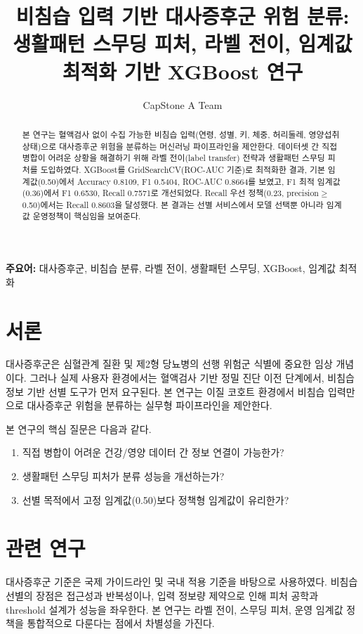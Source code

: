 \documentclass[10pt,twocolumn]{article}
\title{\textbf{비침습 입력 기반 대사증후군 위험 분류:\\생활패턴 스무딩 피처, 라벨 전이, 임계값 최적화 기반 XGBoost 연구}}
\author{CapStone A Team}
\date{}
\begin{document}
\maketitle

\begin{abstract}
본 연구는 혈액검사 없이 수집 가능한 비침습 입력(연령, 성별, 키, 체중, 허리둘레, 영양섭취 상태)으로 대사증후군 위험을 분류하는 머신러닝 파이프라인을 제안한다.
데이터셋 간 직접 병합이 어려운 상황을 해결하기 위해 라벨 전이(label transfer) 전략과 생활패턴 스무딩 피처를 도입하였다.
XGBoost를 GridSearchCV(ROC-AUC 기준)로 최적화한 결과, 기본 임계값(0.50)에서 Accuracy 0.8109, F1 0.5404, ROC-AUC 0.8664를 보였고,
F1 최적 임계값(0.36)에서 F1 0.6530, Recall 0.7571로 개선되었다.
Recall 우선 정책(0.23, precision$\ge$0.50)에서는 Recall 0.8603을 달성했다.
본 결과는 선별 서비스에서 모델 선택뿐 아니라 임계값 운영정책이 핵심임을 보여준다.
\end{abstract}

\noindent\textbf{주요어:} 대사증후군, 비침습 분류, 라벨 전이, 생활패턴 스무딩, XGBoost, 임계값 최적화

\section{서론}
대사증후군은 심혈관계 질환 및 제2형 당뇨병의 선행 위험군 식별에 중요한 임상 개념이다.
그러나 실제 사용자 환경에서는 혈액검사 기반 정밀 진단 이전 단계에서, 비침습 정보 기반 선별 도구가 먼저 요구된다.
본 연구는 이질 코호트 환경에서 비침습 입력만으로 대사증후군 위험을 분류하는 실무형 파이프라인을 제안한다.

본 연구의 핵심 질문은 다음과 같다.
\begin{enumerate}[leftmargin=1.2em]
\item 직접 병합이 어려운 건강/영양 데이터 간 정보 연결이 가능한가?
\item 생활패턴 스무딩 피처가 분류 성능을 개선하는가?
\item 선별 목적에서 고정 임계값(0.50)보다 정책형 임계값이 유리한가?
\end{enumerate}

\section{관련 연구}
대사증후군 기준은 국제 가이드라인 및 국내 적용 기준을 바탕으로 사용하였다.
비침습 선별의 장점은 접근성과 반복성이나, 입력 정보량 제약으로 인해 피처 공학과 threshold 설계가 성능을 좌우한다.
본 연구는 라벨 전이, 스무딩 피처, 운영 임계값 정책을 통합적으로 다룬다는 점에서 차별성을 가진다.
\end{document}
